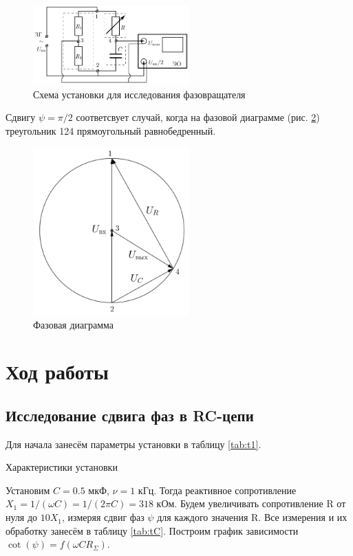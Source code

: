 \documentclass[12pt,a4paper]{article}
\begin{document}
    \begin{figure}[h!]
    	\centering
    	\includegraphics[width=6cm]{res/scheme2.png}
    	\caption{Схема установки для исследования фазовращателя}
    	\label{fig:s2}
    \end{figure}
    
    Сдвигу $\psi = \pi/2$ соответсвует случай, когда на фазовой диаграмме (рис. \ref{fig:ph}) треугольник 124 прямоугольный равнобедренный.
    
    \begin{figure}[h!]
    	\centering
    	\includegraphics[width=6cm]{res/phase.png}
    	\caption{Фазовая диаграмма}
    	\label{fig:ph}
    \end{figure}
    

\section*{Ход работы}

\subsection*{Исследование сдвига фаз в RC-цепи}

Для начала занесём параметры установки в таблицу \ref{tab:t1}.

\begin{table}[H]
	\caption{Характеристики установки}
	
	\label{tab:t1}
\end{table}

Установим $C = 0.5$ мкФ, $\nu = 1$ кГц. Тогда реактивное сопротивление $X_1=1/(\omega C)=1/(2\pi C)=318$ кОм.
Будем увеличивать сопротивление R от нуля до $10 X_1$, измеряя сдвиг фаз $\psi$ для каждого значения R.
Все измерения и их обработку занесём в таблицу \ref{tab:tC}. Построим график зависимости $\cot(\psi)=f\left( \omega C R_\Sigma \right)$.
\end{document}
